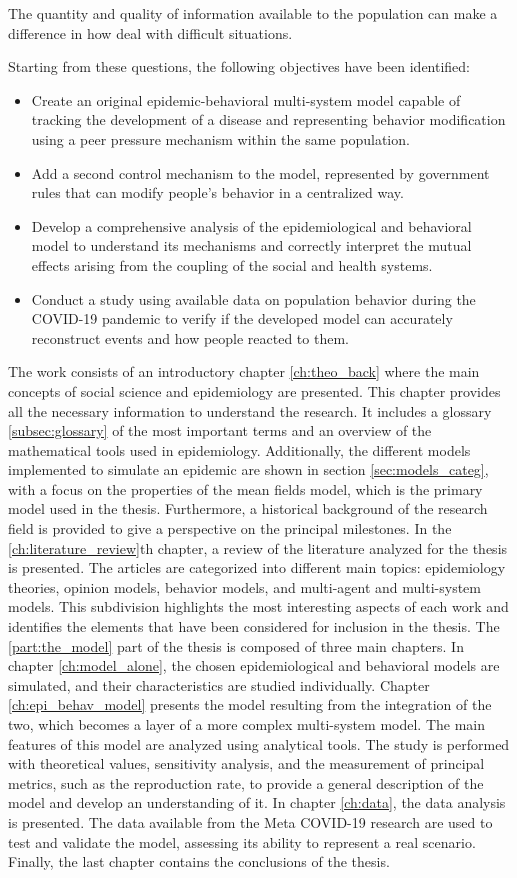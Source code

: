 The quantity and quality of information available to the population can make a difference in how deal with difficult situations.

Starting from these questions, the following objectives have been identified:
\begin{itemize}
	\item Create an original epidemic-behavioral multi-system model capable of tracking the development of a disease and representing behavior modification using a peer pressure mechanism within the same population.
	\item Add a second control mechanism to the model, represented by government rules that can modify people's behavior in a centralized way.
	\item Develop a comprehensive analysis of the epidemiological and behavioral model to understand its mechanisms and correctly interpret the mutual effects arising from the coupling of the social and health systems.
	\item Conduct a study using available data on population behavior during the COVID-19 pandemic to verify if the developed model can accurately reconstruct events and how people reacted to them.
\end{itemize}
The work consists of an introductory chapter \ref{ch:theo_back} where the main concepts of social science and epidemiology are presented. This chapter provides all the necessary information to understand the research. It includes a glossary \ref{subsec:glossary} of the most important terms and an overview of the mathematical tools used in epidemiology. Additionally, the different models implemented to simulate an epidemic are shown in section \ref{sec:models_categ}, with a focus on the properties of the mean fields model, which is the primary model used in the thesis. Furthermore, a historical background of the research field is provided to give a perspective on the principal milestones.
In the \ref{ch:literature_review}th chapter, a review of the literature analyzed for the thesis is presented. The articles are categorized into different main topics: epidemiology theories, opinion models, behavior models, and multi-agent and multi-system models. This subdivision highlights the most interesting aspects of each work and identifies the elements that have been considered for inclusion in the thesis.
The \ref{part:the_model} part of the thesis is composed of three main chapters. In chapter \ref{ch:model_alone}, the chosen epidemiological and behavioral models are simulated, and their characteristics are studied individually. Chapter \ref{ch:epi_behav_model} presents the model resulting from the integration of the two, which becomes a layer of a more complex multi-system model. The main features of this model are analyzed using analytical tools. The study is performed with theoretical values, sensitivity analysis, and the measurement of principal metrics, such as the reproduction rate, to provide a general description of the model and develop an understanding of it.
In chapter \ref{ch:data}, the data analysis is presented. The data available from the Meta COVID-19 research are used to test and validate the model, assessing its ability to represent a real scenario. Finally, the last chapter contains the conclusions of the thesis.
 

